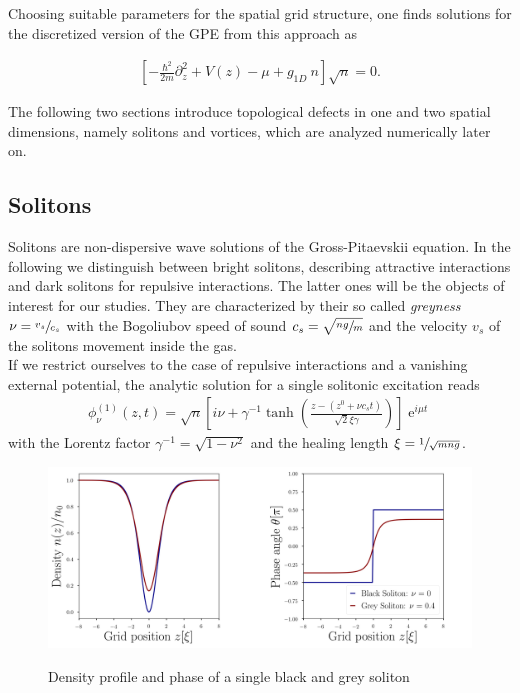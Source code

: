 Choosing suitable parameters for the spatial grid structure, one finds solutions for the discretized version of the GPE from this approach as

\begin{align}
	\left[-\frac{\hbar^2}{2m}\partial_z^2 + V(z) - \mu + g_{1D}\ n\right]\sqrt{n} = 0.
\end{align}

 The following two sections introduce topological defects in one and two spatial dimensions, namely solitons and vortices, which are analyzed numerically later on.

\subsection{Solitons}
Solitons are non-dispersive wave solutions of the Gross-Pitaevskii equation. In the following we distinguish between bright solitons, describing attractive interactions and dark solitons for repulsive interactions. The latter ones will be the objects of interest for our studies. They are characterized by their so called \textit{greyness} $\nu = \sfrac{v_s}{c_s}$ with the Bogoliubov speed of sound $c_s = \sqrt{\sfrac{ng}{m}}$ and the velocity $v_s$ of the solitons movement inside the gas. \\
If we restrict ourselves to the case of repulsive interactions and a vanishing external potential, the analytic solution for a single solitonic excitation reads 
\begin{align}
	\phi_{\nu}^{(1)}(z,t) = \sqrt{n}\left[ i\nu + \gamma^{-1}\tanh\left(\frac{z - (z^0 + \nu c_s t)}{\sqrt{2}\xi\gamma}\right) \right]\operatorname{e}^{i\mu t}\label{eqn:analytic}
\end{align}
with the Lorentz factor $\gamma^{-1} = \sqrt{1 - \nu^2}$ and the healing length $\xi = \sfrac{1}{\sqrt{mng}}$.

\begin{figure}[H]
\centering
\includegraphics[scale = 0.35]{figures/black_and_grey}
\label{fig:SolitonAnalytical}
\caption{Density profile and phase of a single black and grey soliton}
\end{figure}


